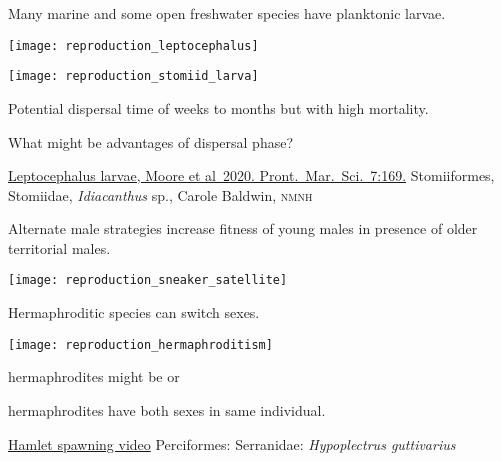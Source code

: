 \label{key}\documentclass[t]{beamer}
\begin{document}
%

\begin{frame}[t]{Many marine and some open freshwater species have planktonic larvae.}

\vspace{-\baselineskip}

\begin{multicols}{2}
\texttt{[image: reproduction\_leptocephalus]}

\columnbreak

\texttt{[image: reproduction\_stomiid\_larva]}

\end{multicols}

\vspace{-0.5\baselineskip}

\hangpara Potential dispersal time of weeks to months but with high mortality. 

\hangpara What might be advantages of dispersal phase?

\vfilll

\tiny\href{https://doi.org/10.3389/fmars.2020.00169}{Leptocephalus larvae, Moore et al~2020. Pront.~Mar.~Sci.~7:169.} \hfill Stomiiformes, Stomiidae, \textit{Idiacanthus} sp., Carole Baldwin, \textsc{nmnh}
\end{frame}


\begin{frame}[t]{Alternate male strategies increase fitness of young males in presence of older territorial males.}

\texttt{[image: reproduction\_sneaker\_satellite]}

\end{frame}

\begin{frame}[t]{Hermaphroditic species can switch sexes.}

\vspace{-\baselineskip}

\begin{multicols}{2}

\texttt{[image: reproduction\_hermaphroditism]}

\columnbreak

 hermaphrodites might be  or 

\vspace{\baselineskip}

 hermaphrodites have both sexes in same individual.

\end{multicols}

\vfilll

\tiny \href{https://www.youtube.com/watch?v=lEMCqVBB0CM}{Hamlet spawning video} \hfill Perciformes: Serranidae: \textit{Hypoplectrus guttivarius}

\end{frame}
\end{document}

